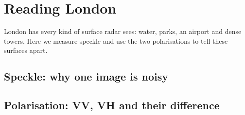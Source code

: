 \chapter{Reading London}\label{ch:london}
London has every kind of surface radar sees: water, parks, an airport and dense towers. Here we measure speckle and use the two polarisations to tell these surfaces apart.

\section{Speckle: why one image is noisy}

\section{Polarisation: VV, VH and their difference}

